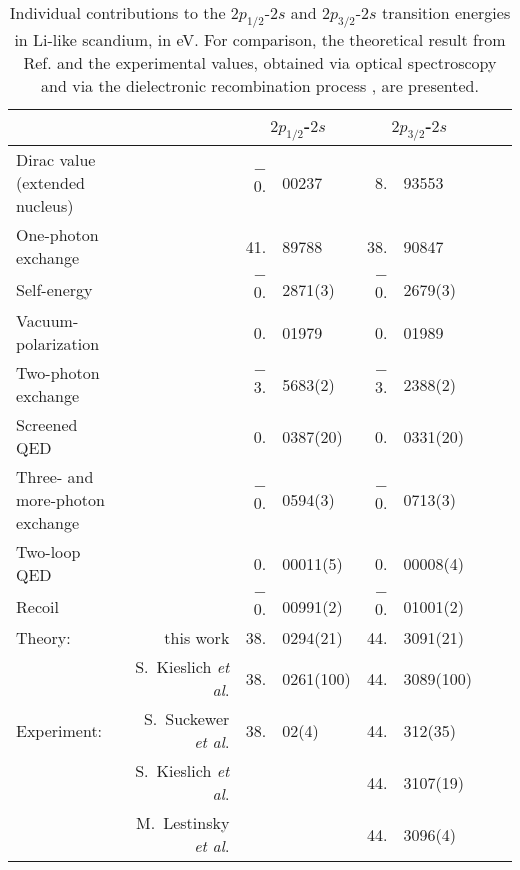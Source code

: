 \documentclass[preprint,aps,pra,showpacs,floatfix]{revtex4}
\newcommand{\po}{$2p_{1/2}$}
\newcommand{\pt}{$2p_{3/2}$}
\newcommand{\s}{$2s$}
\begin{document}
\begin{table}
\label{tab:en}
\caption{
Individual contributions to the ${2p_{1/2}}$-${2s}$ and ${2p_{3/2}}$-${2s}$
transition energies in Li-like scandium, in eV. For comparison, the theoretical
result from Ref. \cite{kieslich:PRA:04} and the experimental values, obtained
via optical spectroscopy \cite{pl:suckewer80} and via the dielectronic recombination
process \cite{kieslich:PRA:04,les:EGAS}, are presented.
}
\linespread{1}
\begin{center}
\begin{tabular}{lr|r@{}l|r@{}lr@{}l}
\hline
\hline
&&
\multicolumn{2}{c}{\po-\s} &
\multicolumn{2}{c}{\pt-\s}
\\
%
\hline
%
Dirac value (extended nucleus) &&
    $-$0.&00237 &
       8.&93553 \\
%
One-photon exchange &&
      41.&89788 &
      38.&90847 \\
%
Self-energy &&
    $-$0.&2871(3) &
    $-$0.&2679(3) \\
%
Vacuum-polarization &&
       0.&01979 &
       0.&01989 \\
%
Two-photon exchange &&
    $-$3.&5683(2) &
    $-$3.&2388(2) \\
%
Screened QED &&
       0.&0387(20) &
       0.&0331(20) \\
%
Three- and more-photon exchange &&
    $-$0.&0594(3) &
    $-$0.&0713(3) \\
%
Two-loop QED &&
       0.&00011(5) &
       0.&00008(4) \\
%
Recoil &&
    $-$0.&00991(2) &
    $-$0.&01001(2) \\
\hline
%
Theory: &this work  &
       38.&0294(21) &
       44.&3091(21) \\
%
&
S.~Kieslich {\it et al}. \cite{kieslich:PRA:04}&  
       38.&0261(100) &
       44.&3089(100) \\
%
Experiment: &
S.~Suckewer {\it et al}. \cite{pl:suckewer80} &
       38.&02(4)   &
       44.&312(35) \\
&
S.~Kieslich {\it et al}. \cite{kieslich:PRA:04} &
       &    &
       44.&3107(19) \\
&
M.~Lestinsky {\it et al}. \cite{les:EGAS} &
       &    &
       44.&3096(4) \\
%
\hline
\hline
\end{tabular}
\end{center}
\end{table}
%
\end{document}
